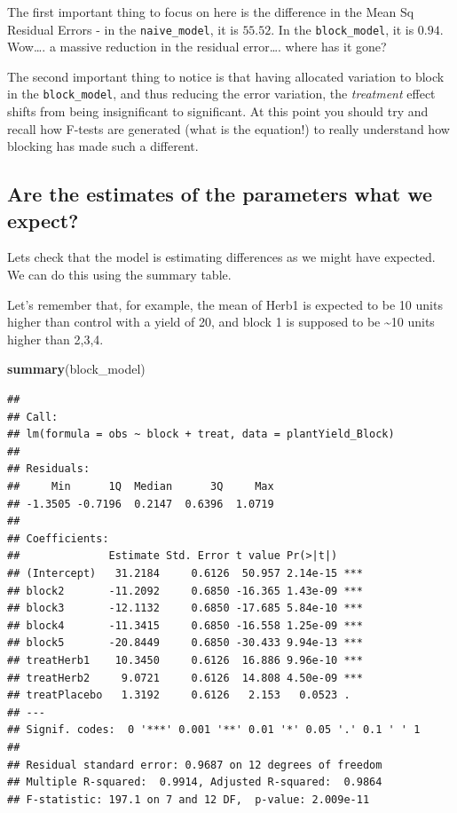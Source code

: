 \documentclass[
]{book}
\newenvironment{Shaded}{\begin{snugshade}}{\end{snugshade}}
\newcommand{\FunctionTok}[1]{\textcolor[rgb]{0.13,0.29,0.53}{\textbf{#1}}}
\newcommand{\NormalTok}[1]{#1}
\begin{document}
The first important thing to focus on here is the difference in the Mean Sq Residual Errors - in the \texttt{naive\_model}, it is \(55.52\). In the \texttt{block\_model}, it is \(0.94\). Wow\ldots. a massive reduction in the residual error\ldots. where has it gone?

The second important thing to notice is that having allocated variation to block in the \texttt{block\_model}, and thus reducing the error variation, the \emph{treatment} effect shifts from being insignificant to significant. At this point you should try and recall how F-tests are generated (what is the equation!) to really understand how blocking has made such a different.

\hypertarget{are-the-estimates-of-the-parameters-what-we-expect}{%
\subsection{Are the estimates of the parameters what we expect?}\label{are-the-estimates-of-the-parameters-what-we-expect}}

Lets check that the model is estimating differences as we might have expected. We can do this using the summary table.

Let's remember that, for example, the mean of Herb1 is expected to be 10 units higher than control with a yield of 20, and block 1 is supposed to be \textasciitilde10 units higher than 2,3,4.

\begin{Shaded}
\begin{Highlighting}[]
\FunctionTok{summary}\NormalTok{(block\_model)}
\end{Highlighting}
\end{Shaded}

\begin{verbatim}
## 
## Call:
## lm(formula = obs ~ block + treat, data = plantYield_Block)
## 
## Residuals:
##     Min      1Q  Median      3Q     Max 
## -1.3505 -0.7196  0.2147  0.6396  1.0719 
## 
## Coefficients:
##              Estimate Std. Error t value Pr(>|t|)    
## (Intercept)   31.2184     0.6126  50.957 2.14e-15 ***
## block2       -11.2092     0.6850 -16.365 1.43e-09 ***
## block3       -12.1132     0.6850 -17.685 5.84e-10 ***
## block4       -11.3415     0.6850 -16.558 1.25e-09 ***
## block5       -20.8449     0.6850 -30.433 9.94e-13 ***
## treatHerb1    10.3450     0.6126  16.886 9.96e-10 ***
## treatHerb2     9.0721     0.6126  14.808 4.50e-09 ***
## treatPlacebo   1.3192     0.6126   2.153   0.0523 .  
## ---
## Signif. codes:  0 '***' 0.001 '**' 0.01 '*' 0.05 '.' 0.1 ' ' 1
## 
## Residual standard error: 0.9687 on 12 degrees of freedom
## Multiple R-squared:  0.9914, Adjusted R-squared:  0.9864 
## F-statistic: 197.1 on 7 and 12 DF,  p-value: 2.009e-11
\end{verbatim}
\end{document}
